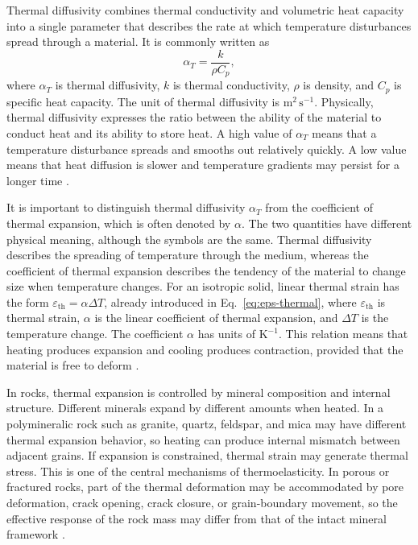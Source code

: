 Thermal diffusivity combines thermal conductivity and volumetric heat capacity into a single parameter that describes the rate at which temperature disturbances spread through a material. It is commonly written as
\begin{equation}
\label{eq:thermal-diff}
\alpha_T = \frac{k}{\rho C_p},
\end{equation}
where \(\alpha_T\) is thermal diffusivity, \(k\) is thermal conductivity, \(\rho\) is density, and \(C_p\) is specific heat capacity. The unit of thermal diffusivity is \(\mathrm{m^2\,s^{-1}}\). Physically, thermal diffusivity expresses the ratio between the ability of the material to conduct heat and its ability to store heat. A high value of \(\alpha_T\) means that a temperature disturbance spreads and smooths out relatively quickly. A low value means that heat diffusion is slower and temperature gradients may persist for a longer time \cite{robertson1988,turcotte2014}.

It is important to distinguish thermal diffusivity \(\alpha_T\) from the coefficient of thermal expansion, which is often denoted by \(\alpha\). The two quantities have different physical meaning, although the symbols are the same. Thermal diffusivity describes the spreading of temperature through the medium, whereas the coefficient of thermal expansion describes the tendency of the material to change size when temperature changes. For an isotropic solid, linear thermal strain has the form \(\varepsilon_{\mathrm{th}} = \alpha\Delta T\), already introduced in Eq.~\eqref{eq:eps-thermal},
where \(\varepsilon_{\mathrm{th}}\) is thermal strain, \(\alpha\) is the linear coefficient of thermal expansion, and \(\Delta T\) is the temperature change. The coefficient \(\alpha\) has units of \(\mathrm{K^{-1}}\). This relation means that heating produces expansion and cooling produces contraction, provided that the material is free to deform \cite{boley1960,nowacki1986}.

In rocks, thermal expansion is controlled by mineral composition and internal structure. Different minerals expand by different amounts when heated. In a polymineralic rock such as granite, quartz, feldspar, and mica may have different thermal expansion behavior, so heating can produce internal mismatch between adjacent grains. If expansion is constrained, thermal strain may generate thermal stress. This is one of the central mechanisms of thermoelasticity. In porous or fractured rocks, part of the thermal deformation may be accommodated by pore deformation, crack opening, crack closure, or grain-boundary movement, so the effective response of the rock mass may differ from that of the intact mineral framework \cite{robertson1988,jaeger2007,nowacki1986}.


